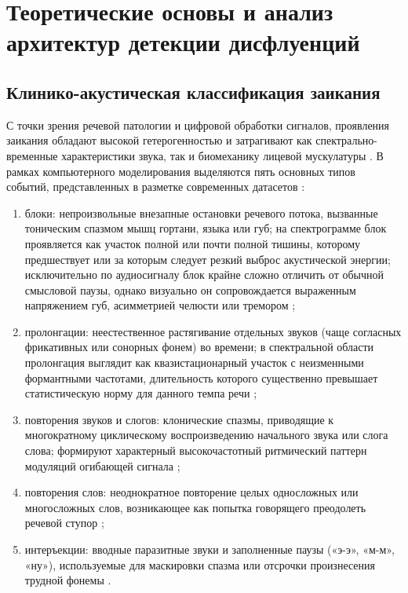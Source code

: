 \documentclass[a4paper,14pt]{extarticle}
\begin{document}
	\newpage
	\section{Теоретические основы и анализ архитектур детекции дисфлуенций}
	
	\subsection{Клинико-акустическая классификация заикания}
	С точки зрения речевой патологии и цифровой обработки сигналов, проявления заикания обладают высокой гетерогенностью и затрагивают как спектрально-временные характеристики звука, так и биомеханику лицевой мускулатуры \cite{ivankin, sep28k}. В рамках компьютерного моделирования выделяются пять основных типов событий, представленных в разметке современных датасетов \cite{sep28k}:
	\begin{enumerate}
		\item блоки: непроизвольные внезапные остановки речевого потока, вызванные тоническим спазмом мышц гортани, языка или губ; на спектрограмме блок проявляется как участок полной или почти полной тишины, которому предшествует или за которым следует резкий выброс акустической энергии; исключительно по аудиосигналу блок крайне сложно отличить от обычной смысловой паузы, однако визуально он сопровождается выраженным напряжением губ, асимметрией челюсти или тремором \cite{ivankin};
		\item пролонгации: неестественное растягивание отдельных звуков (чаще согласных фрикативных или сонорных фонем) во времени; в спектральной области пролонгация выглядит как квазистационарный участок с неизменными формантными частотами, длительность которого существенно превышает статистическую норму для данного темпа речи \cite{sep28k};
		\item повторения звуков и слогов: клонические спазмы, приводящие к многократному циклическому воспроизведению начального звука или слога слова; формируют характерный высокочастотный ритмический паттерн модуляций огибающей сигнала \cite{sep28k};
		\item повторения слов: неоднократное повторение целых односложных или многосложных слов, возникающее как попытка говорящего преодолеть речевой ступор \cite{sep28k};
		\item интеръекции: вводные паразитные звуки и заполненные паузы («э-э», «м-м», «ну»), используемые для маскировки спазма или отсрочки произнесения трудной фонемы \cite{sep28k}.
	\end{enumerate}
	
\end{document}
